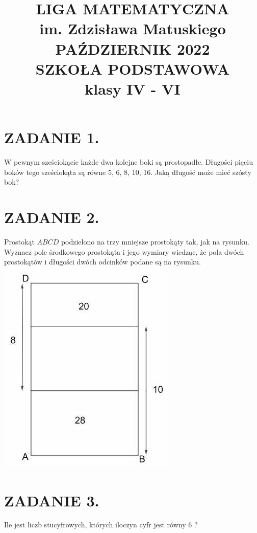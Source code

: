 \documentclass[10pt]{article}
\title{LIGA MATEMATYCZNA \\
 im. Zdzisława Matuskiego \\
 PAŹDZIERNIK 2022 \\
 SZKOŁA PODSTAWOWA \\
 klasy IV - VI }
\author{}
\date{}
\begin{document}
\maketitle
\section*{ZADANIE 1.}
W pewnym sześciokącie każde dwa kolejne boki są prostopadłe. Długości pięciu boków tego sześciokąta są równe 5, 6, 8, 10, 16. Jaką długość może mieć szósty bok?

\section*{ZADANIE 2.}
Prostokąt \(A B C D\) podzielono na trzy mniejsze prostokąty tak, jak na rysunku. Wyznacz pole środkowego prostokąta i jego wymiary wiedząc, że pola dwóch prostokątów i długości dwóch odcinków podane są na rysunku.\\
\includegraphics[max width=\textwidth, center]{2024_11_21_f6b427e3db4760b1cff2g-1}

\section*{ZADANIE 3.}
Ile jest liczb stucyfrowych, których iloczyn cyfr jest równy 6 ?
\end{document}
